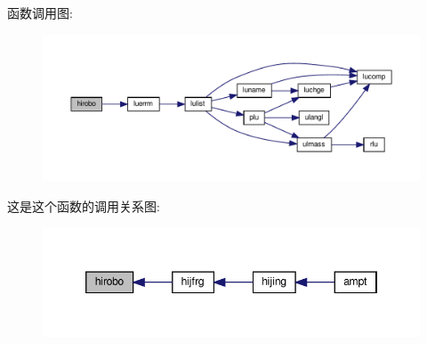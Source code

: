 函数调用图\+:
\nopagebreak
\begin{figure}[H]
\begin{center}
\leavevmode
\includegraphics[width=350pt]{hirobo_8f90_a717ccbe1cfc2d8abf8fb9262fa72416f_cgraph}
\end{center}
\end{figure}
这是这个函数的调用关系图\+:
\nopagebreak
\begin{figure}[H]
\begin{center}
\leavevmode
\includegraphics[width=346pt]{hirobo_8f90_a717ccbe1cfc2d8abf8fb9262fa72416f_icgraph}
\end{center}
\end{figure}
